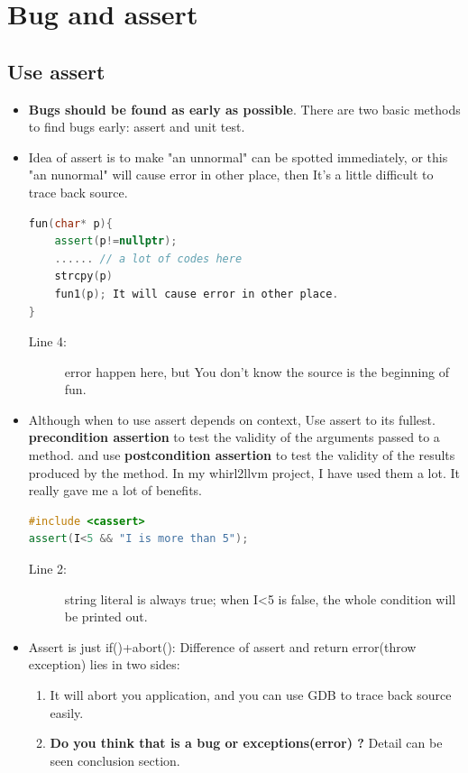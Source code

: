 \documentclass[a4paper,11pt,twoside]{book}
\begin{document}
\section{Bug and assert}
\subsection{Use assert}
\begin{itemize}
	\item \textbf{Bugs should be found as early as possible}. There are two basic methods to find bugs early: assert and unit test.
	
	\item Idea of assert is to make "an unnormal" can be spotted immediately, or this "an nunormal" will cause error in other place, then It's a little difficult to trace back source.
\begin{lstlisting}[frame=single, language=c++]
fun(char* p){
	assert(p!=nullptr);
	...... // a lot of codes here
	strcpy(p) 
	fun1(p); It will cause error in other place.
}
\end{lstlisting}
\begin{description}
	\item[Line 4:] error happen here, but You don't know the source is the beginning of fun.
\end{description}
	
	\item Although when to use assert depends on context, Use assert to its fullest. \textbf{precondition assertion} to test the validity of the arguments passed to a method. and use \textbf{postcondition assertion} to test the validity of the results produced by the method.  In my whirl2llvm project, I have used them a lot. It really gave me a lot of benefits.
\begin{lstlisting}[frame=single, language=c++]
#include <cassert>
assert(I<5 && "I is more than 5");
\end{lstlisting}
\begin{description}
	\item[Line 2:] string literal is always true; when I<5 is false, the whole condition will be printed out.
\end{description}
	
	
	\item Assert is just if()+abort(): Difference of assert and return error(throw exception)  lies in two sides: 
	\begin{enumerate}
		\item It will abort you application, and you can use GDB to trace back source easily.
		\item \textbf{Do you think that is a bug or  exceptions(error) ?} Detail can be seen conclusion section.
	\end{enumerate}
	

\end{itemize}
\end{document}
